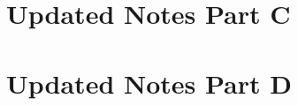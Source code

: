 \documentclass[%
	,graybox
	,envcountsect			%
	]{svmono}
\begin{document}
\chapter{Updated Notes  Part C}
	
\chapter{Updated Notes Part D}
	

\backmatter

\cleardoublepage 

{\RaggedRight
{}
}

\end{document}
